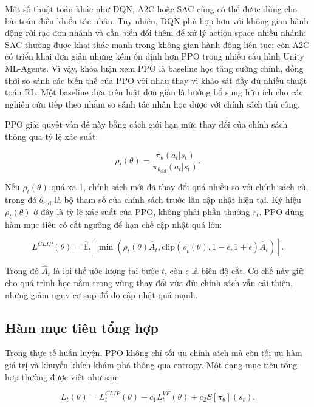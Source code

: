 Một số thuật toán khác như DQN, A2C hoặc SAC cũng có thể được dùng cho bài toán điều khiển tác nhân. Tuy nhiên, DQN phù hợp hơn với không gian hành động rời rạc đơn nhánh và cần biến đổi thêm để xử lý action space nhiều nhánh; SAC thường được khai thác mạnh trong không gian hành động liên tục; còn A2C có triển khai đơn giản nhưng kém ổn định hơn PPO trong nhiều cấu hình Unity ML-Agents. Vì vậy, khóa luận xem PPO là baseline học tăng cường chính, đồng thời so sánh các biến thể của PPO với nhau thay vì khảo sát đầy đủ nhiều thuật toán RL. Một baseline dựa trên luật đơn giản là hướng bổ sung hữu ích cho các nghiên cứu tiếp theo nhằm so sánh tác nhân học được với chính sách thủ công.

PPO giải quyết vấn đề này bằng cách giới hạn mức thay đổi của chính sách thông qua tỷ lệ xác suất:

\begin{equation}
    \rho_t(\theta) =
    \frac{\pi_\theta(a_t|s_t)}
    {\pi_{\theta_{\mathrm{old}}}(a_t|s_t)}.
\end{equation}

Nếu $\rho_t(\theta)$ quá xa 1, chính sách mới đã thay đổi quá nhiều so với chính sách cũ, trong đó $\theta_{\mathrm{old}}$ là bộ tham số của chính sách trước lần cập nhật hiện tại. Ký hiệu $\rho_t(\theta)$ ở đây là tỷ lệ xác suất của PPO, không phải phần thưởng $r_t$. PPO dùng hàm mục tiêu có cắt ngưỡng để hạn chế cập nhật quá lớn:

\begin{equation} \label{eq:ppo_clip}
    L^{CLIP}(\theta) =
    \hat{\mathbb{E}}_t
    \left[
    \min
    \left(
    \rho_t(\theta)\hat{A}_t,
    \mathrm{clip}(\rho_t(\theta),1-\epsilon,1+\epsilon)\hat{A}_t
    \right)
    \right].
\end{equation}

Trong đó $\hat{A}_t$ là lợi thế ước lượng tại bước $t$, còn $\epsilon$ là biên độ cắt. Cơ chế này giữ cho quá trình học nằm trong vùng thay đổi vừa đủ: chính sách vẫn cải thiện, nhưng giảm nguy cơ sụp đổ do cập nhật quá mạnh.

\subsection{Hàm mục tiêu tổng hợp}

Trong thực tế huấn luyện, PPO không chỉ tối ưu chính sách mà còn tối ưu hàm giá trị và khuyến khích khám phá thông qua entropy. Một dạng mục tiêu tổng hợp thường được viết như sau:

\begin{equation} \label{eq:ppo_total}
    L_t(\theta) =
    L_t^{CLIP}(\theta)
    - c_1 L_t^{VF}(\theta)
    + c_2 S[\pi_\theta](s_t).
\end{equation}

